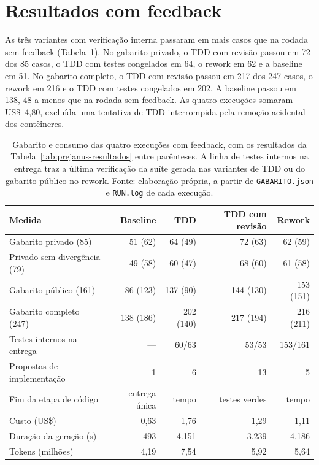 \documentclass[a4paper,12pt,twoside,english,brazilian]{book}
\begin{document}
\section{Resultados com feedback}
\label{sec:prejanus-resultados-licoes}

As três variantes com verificação interna passaram em mais casos que na
rodada sem feedback (Tabela~\ref{tab:prejanus-resultados-licoes}). No
gabarito privado, o TDD com revisão passou em 72 dos 85 casos, o TDD com
testes congelados em 64, o rework em 62 e a baseline em 51. No gabarito
completo, o TDD com revisão passou em 217 dos 247 casos, o rework em 216 e o
TDD com testes congelados em 202. A baseline passou em 138, 48 a menos que
na rodada sem feedback. As quatro execuções somaram US\$~4,80, excluída uma
tentativa de TDD interrompida pela remoção acidental dos contêineres.

\begin{table}[htp]
  \centering
  \caption{Gabarito e consumo das quatro execuções com feedback, com os
    resultados da Tabela~\ref{tab:prejanus-resultados} entre parênteses.
    A linha de testes internos na entrega traz a última verificação da
    suíte gerada nas variantes de TDD ou do gabarito público no rework.
    Fonte: elaboração própria, a partir de \texttt{GABARITO.json} e
    \texttt{RUN.log} de cada execução.}
  \label{tab:prejanus-resultados-licoes}
  \small
  \begin{tabular}{lrrrr}
    \hline
    Medida & Baseline & TDD & TDD com revisão & Rework \\
    \hline
    Gabarito privado (85) & 51 (62) & 64 (49) & 72 (63) & 62 (59) \\
    Privado sem divergência (79) & 49 (58) & 60 (47) & 68 (60) & 61 (58) \\
    Gabarito público (161) & 86 (123) & 137 (90) & 144 (130) & 153 (151) \\
    Gabarito completo (247) & 138 (186) & 202 (140) & 217 (194) & 216 (211) \\
    \hline
    Testes internos na entrega & --- & 60/63 & 53/53 & 153/161 \\
    Propostas de implementação & 1 & 6 & 13 & 5 \\
    Fim da etapa de código & entrega única & tempo & testes verdes & tempo \\
    Custo (US\$) & 0,63 & 1,76 & 1,29 & 1,11 \\
    Duração da geração (s) & 493 & 4.151 & 3.239 & 4.186 \\
    Tokens (milhões) & 4,19 & 7,54 & 5,92 & 5,64 \\
    \hline
  \end{tabular}
\end{table}
\end{document}
